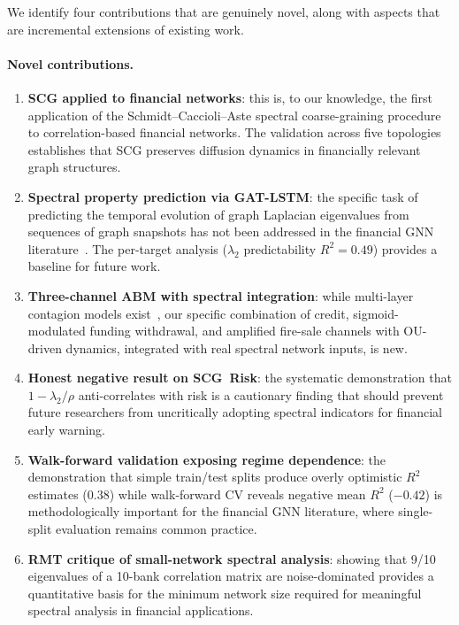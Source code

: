 We identify four contributions that are genuinely novel, along with aspects that are incremental extensions of existing work.

\paragraph{Novel contributions.}
\begin{enumerate}
    \item \textbf{SCG applied to financial networks}: this is, to our knowledge, the first application of the Schmidt--Caccioli--Aste spectral coarse-graining procedure~\cite{schmidt2024spectral} to correlation-based financial networks. The validation across five topologies establishes that SCG preserves diffusion dynamics in financially relevant graph structures.

    \item \textbf{Spectral property prediction via GAT-LSTM}: the specific task of predicting the temporal evolution of graph Laplacian eigenvalues from sequences of graph snapshots has not been addressed in the financial GNN literature~\cite{wu2020comprehensive}. The per-target analysis ($\lambda_2$ predictability $R^2 = 0.49$) provides a baseline for future work.

    \item \textbf{Three-channel ABM with spectral integration}: while multi-layer contagion models exist~\cite{poledna2015economics,montagna2016multi}, our specific combination of credit, sigmoid-modulated funding withdrawal, and amplified fire-sale channels with OU-driven dynamics, integrated with real spectral network inputs, is new.

    \item \textbf{Honest negative result on SCG~Risk}: the systematic demonstration that $1 - \lambda_2/\rho$ anti-correlates with risk is a cautionary finding that should prevent future researchers from uncritically adopting spectral indicators for financial early warning.

    \item \textbf{Walk-forward validation exposing regime dependence}: the demonstration that simple train/test splits produce overly optimistic $R^2$ estimates ($0.38$) while walk-forward CV reveals negative mean $R^2$ ($-0.42$) is methodologically important for the financial GNN literature, where single-split evaluation remains common practice.

    \item \textbf{RMT critique of small-network spectral analysis}: showing that 9/10 eigenvalues of a 10-bank correlation matrix are noise-dominated provides a quantitative basis for the minimum network size required for meaningful spectral analysis in financial applications.
\end{enumerate}

